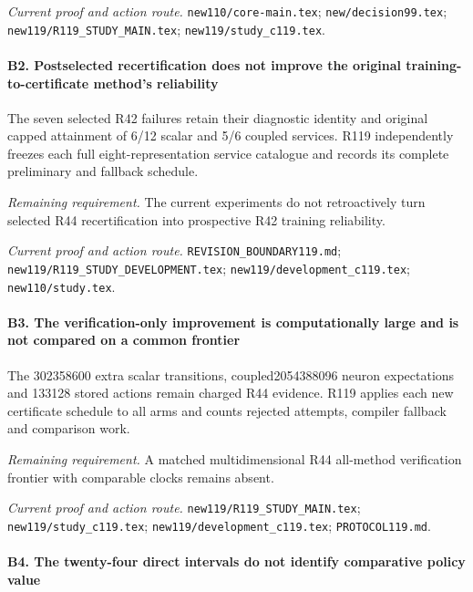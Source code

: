 \par\emph{Current proof and action route.} \nolinkurl{new110/core-main.tex}; \nolinkurl{new/decision99.tex}; \nolinkurl{new119/R119_STUDY_MAIN.tex}; \nolinkurl{new119/study_c119.tex}.

\paragraph{B2. Postselected recertification does not improve the original training-to-certificate method's reliability}

The seven selected R42 failures retain their diagnostic identity and original capped attainment of 6/12 scalar and 5/6 coupled services. R119 independently freezes each full eight-representation service catalogue and records its complete preliminary and fallback schedule.

\par\emph{Remaining requirement.} The current experiments do not retroactively turn selected R44 recertification into prospective R42 training reliability.

\par\emph{Current proof and action route.} \nolinkurl{REVISION_BOUNDARY119.md}; \nolinkurl{new119/R119_STUDY_DEVELOPMENT.tex}; \nolinkurl{new119/development_c119.tex}; \nolinkurl{new110/study.tex}.

\paragraph{B3. The verification-only improvement is computationally large and is not compared on a common frontier}

The 302358600 extra scalar transitions, coupled2054388096 neuron expectations and 133128 stored actions remain charged R44 evidence. R119 applies each new certificate schedule to all arms and counts rejected attempts, compiler fallback and comparison work.

\par\emph{Remaining requirement.} A matched multidimensional R44 all-method verification frontier with comparable clocks remains absent.

\par\emph{Current proof and action route.} \nolinkurl{new119/R119_STUDY_MAIN.tex}; \nolinkurl{new119/study_c119.tex}; \nolinkurl{new119/development_c119.tex}; \nolinkurl{PROTOCOL119.md}.

\paragraph{B4. The twenty-four direct intervals do not identify comparative policy value}

